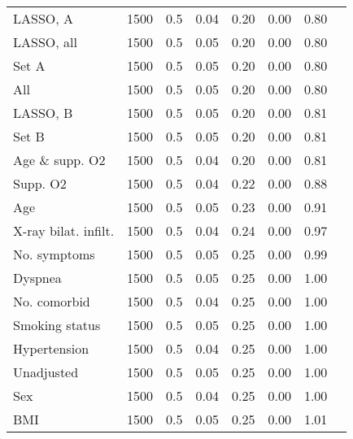 \documentclass{article}
\begin{document}
{\begin{longtable}{lccccccc}
LASSO, A & 1500 & 0.5 & 0.04 & 0.20 & 0.00 & 0.80\\
LASSO, all & 1500 & 0.5 & 0.05 & 0.20 & 0.00 & 0.80\\
Set A & 1500 & 0.5 & 0.05 & 0.20 & 0.00 & 0.80\\
All & 1500 & 0.5 & 0.05 & 0.20 & 0.00 & 0.80\\
LASSO, B & 1500 & 0.5 & 0.05 & 0.20 & 0.00 & 0.81\\
Set B & 1500 & 0.5 & 0.05 & 0.20 & 0.00 & 0.81\\
Age \& supp. O2 & 1500 & 0.5 & 0.04 & 0.20 & 0.00 & 0.81\\
Supp. O2 & 1500 & 0.5 & 0.04 & 0.22 & 0.00 & 0.88\\
Age & 1500 & 0.5 & 0.05 & 0.23 & 0.00 & 0.91\\
X-ray bilat. infilt. & 1500 & 0.5 & 0.04 & 0.24 & 0.00 & 0.97\\
No. symptoms & 1500 & 0.5 & 0.05 & 0.25 & 0.00 & 0.99\\
Dyspnea & 1500 & 0.5 & 0.05 & 0.25 & 0.00 & 1.00\\
No. comorbid & 1500 & 0.5 & 0.04 & 0.25 & 0.00 & 1.00\\
Smoking status & 1500 & 0.5 & 0.05 & 0.25 & 0.00 & 1.00\\
Hypertension & 1500 & 0.5 & 0.04 & 0.25 & 0.00 & 1.00\\
Unadjusted & 1500 & 0.5 & 0.05 & 0.25 & 0.00 & 1.00\\
Sex & 1500 & 0.5 & 0.04 & 0.25 & 0.00 & 1.00\\
BMI & 1500 & 0.5 & 0.05 & 0.25 & 0.00 & 1.01\\
\bottomrule
\hline
\end{longtable}
}

\clearpage
\end{document}
